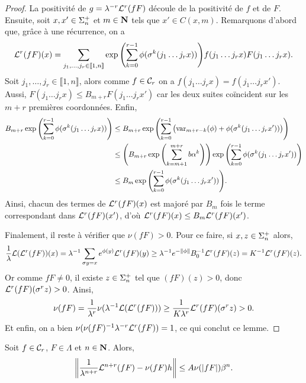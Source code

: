   \begin{proof}
    La positivité de $g = \lambda^{-r}\L^r(fF)$ découle de la positivité de $f$ et de $F$.
    Ensuite, soit $x, x' \in \sp_n$ et $m \in \N$ tels que $x' \in C(x,m)$.
    Remarquons d'abord que, grâce à une récurrence, on a
    $$\L^r(fF)(x) = \sum_{j_1, \hdots, j_r \in \llbracket 1, n\rrbracket}{\exp{\left(\sum_{k=0}^{r-1}{\phi(\sigma^k(j_1\hdots j_rx))}\right)}}
	  f(j_1\hdots j_r x)F(j_1\hdots j_r x).$$
    Soit $j_1, \hdots, j_r \in \llbracket 1, n\rrbracket$, alors comme $f \in \Cr{r}$ on a $f(j_1\hdots j_r x) = f(j_1\hdots j_r x')$. \\
    Aussi, $F(j_1\hdots j_r x) \leq B_{m+r} F(j_1\hdots j_r x')$ car les deux suites coïncident sur les $m+r$ premières coordonnées.
    Enfin,
    \begin{align*}
      B_{m+r}\exp{\left(\sum_{k=0}^{r-1}{\phi(\sigma^k(j_1\hdots j_r x))} \right)}
	&\leq B_{m+r} \exp{\left(\sum_{k=0}^{r-1}{\left(\var_{m+r-k}(\phi) + \phi(\sigma^k(j_1\hdots j_r x'))\right)}\right)} \\
	&\leq \left(B_{m+r} \exp{\left(\sum_{k = m+1}^{m+r} b\alpha^k\right)}\right) \exp{\left(\sum_{k=0}^{r-1}{\phi(\sigma^k(j_1\hdots j_r x'))}\right)} \\
	&\leq B_m \exp{\left(\sum_{k=0}^{r-1}{\phi(\sigma^k(j_1\hdots j_r x'))}\right)}.
    \end{align*}
    Ainsi, chacun des termes de $\L^r(fF)(x)$ est majoré par $B_m$ fois le terme correspondant dans $\L^r(fF)(x')$, d'où
    $\L^r(fF)(x) \leq B_m\L^r(fF)(x')$.

    Finalement, il reste à vérifier que $\nu(fF) > 0$. Pour ce faire, si $x, z \in \sp_n$ alors,
    $$\frac 1 \lambda \L(\L^r(fF))(x) = \lambda^{-1}\sum_{\sigma y=x}{e^{\phi(y)}\L^r(fF)(y)}
				      \geq \lambda^{-1}e^{-\No{\phi}}B_0^{-1}\L^r(fF)(z) = K^{-1}\L^r(fF)(z).$$
    Or comme $fF \not= 0$, il existe $z \in \sp_n$ tel que $(fF)(z) > 0$, donc $\L^r(fF)(\sigma^r z) > 0$. Ainsi,
    $$\nu(fF) = \frac 1 {\lambda^r}\nu(\lambda^{-1}\L(\L^r(fF))) \geq \frac 1 {K\lambda^r} \L^r(fF)(\sigma^r z) > 0.$$
    Et enfin, on a bien $\nu(\nu(fF)^{-1}\lambda^{-r}\L^r(fF)) = 1$, ce qui conclut ce lemme.
  \end{proof}

  \begin{lemma}
    \label{lem:rpf_3_LambdaCr}
    Soit $f \in \Cr{r}$, $F \in \Lambda$ et $n \in \N$.
    Alors,
    $$\No{\frac 1 {\lambda^{n+r}} \L^{n+r}(fF) - \nu(fF)h} \leq A\nu(|fF|)\beta^n.$$
  \end{lemma}

